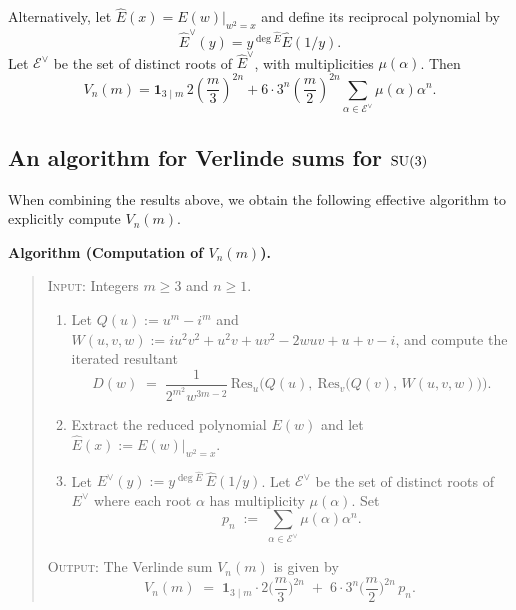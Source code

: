 \documentclass[11pt,reqno]{amsart}
\theoremstyle{remark}
\begin{document}
Alternatively, let $\widehat E(x)=E(w)|_{w^2=x}$ and define its reciprocal polynomial by
\[
\widehat E^\vee(y)=y^{\deg\widehat E}\widehat E(1/y).
\]
Let $\mathcal E^\vee$ be the set of distinct roots of $\widehat E^\vee$, with multiplicities $\mu(\alpha)$.  Then
\begin{equation}\label{eq:algebraic_sum_formula2}
V_n(m)=\mathbf1_{3\mid m}\,2\left(\frac m3\right)^{2n}
+6\cdot3^n\left(\frac m2\right)^{2n}
\sum_{\alpha\in\mathcal E^\vee}\mu(\alpha)\alpha^n.
\end{equation}


\subsection{An algorithm for Verlinde sums for \texorpdfstring{$\text{\rm SU}(3)$}{SU(3)}} \label{sec: alg}

When combining the results above, we obtain the following effective algorithm to explicitly compute $V_n(m)$.

\medskip
\noindent\textbf{Algorithm (Computation of $V_n(m)$).}
\begin{quote}
\textsc{Input:} Integers $m\ge3$ and $n\ge1$.

\begin{enumerate}
\item[\textup{1.}] Let $Q(u):=u^m-i^m$ and $W(u,v,w) := iu^2v^2+u^2v+uv^2-2wuv+u+v-i$,
and compute the iterated resultant
$$
D(w) \;=\; \frac{1}{2^{m^2}w^{3m-2}}\,\mathrm{Res}_u\Big(Q(u),\ \mathrm{Res}_v\big(Q(v),\,W(u,v,w)\big)\Big).
$$
\item[\textup{2.}] Extract the reduced polynomial $E(w)$
and let $\widehat E(x):=E(w)|_{w^2=x}$.
\item[\textup{3.}] Let
$E^\vee(y):=y^{\deg\widehat E}\,\widehat E(1/y)$.  Let $\mathcal{E}^{\vee}$ be the set of
distinct roots of $E^{\vee}$
where each root $\alpha$ has multiplicity $\mu(\alpha)$.  Set
$$
p_n \;:=\; \sum_{\alpha \in \mathcal{E}^{\vee}} \mu(\alpha) \alpha^n.
$$
\end{enumerate}

\textsc{Output:} The Verlinde sum $V_{n}(m)$ is given by
\begin{equation}\label{eq:Verlinde_power_sum}
V_n(m) \;=\; \mathbf{1}_{3\mid m}\cdot 2\Big(\frac{m}{3}\Big)^{2n} \;+\; 6\cdot 3^{n}\Big(\frac{m}{2}\Big)^{2n}\,p_n.
\end{equation}
\end{quote}
\medskip
\end{document}

